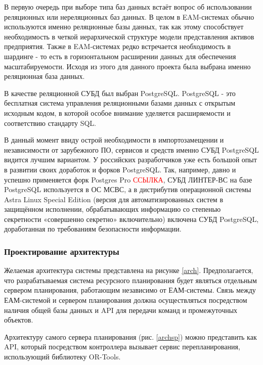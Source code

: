 В первую очередь при выборе типа баз данных встаёт вопрос об использовании реляционных или нереляционных баз данных. В целом в EAM-системах обычно используются именно реляционные базы данных, так как этому способствует необходимость в четкой иерархической структуре модели представления активов предприятия. Также в EAM-системах редко встречается необходимость в шардинге - то есть в горизонтальном расширении данных для обеспечения масштабируемости. Исходя из этого для данного проекта была выбрана именно реляционная база данных.

В качестве реляционной СУБД был выбран PostgreSQL. PostgreSQL - это бесплатная система управления реляционными базами данных с открытым исходным кодом, в которой особое внимание уделяется расширяемости и соответствию стандарту SQL.

В данный момент ввиду острой необходимости в импортозамещении и независимости от зарубежного ПО, сервисов и средств именно СУБД PostgreSQL видится лучшим вариантом. У российских разработчиков уже есть большой опыт в развитии своих доработок и форков PostgreSQL. Так, например, давно и успешно применяется форк Postgres Pro \textcolor{red}{ССЫЛКА}, СУБД ЛИНТЕР-ВС на базе PostgreSQL используется в ОС МСВС, а в дистрибутив операционной системы Astra Linux Special Edition (версия для автоматизированных систем в защищённом исполнении, обрабатывающих информацию со степенью секретности «совершенно секретно» включительно) включена СУБД PostgreSQL, доработанная по требованиям безопасности информации.

\subsubsection{Проектирование архитектуры}

Желаемая архитектура системы представлена на рисунке \ref{arch}. Предполагается, что разрабатываемая система ресурсного планирования будет являться отдельным сервером планирования, работающим независимо от ЕАМ-системы. Связь между ЕАМ-системой и сервером планирования должна осуществляться посредством наличия общей базы данных и API для передачи команд и промежуточных объектов.


Архитектуру самого сервера планирования (рис. \ref{archsp}) можно представить как API, который посредством контроллера вызывает сервис перепланирования, использующий библиотеку OR-Tools.


